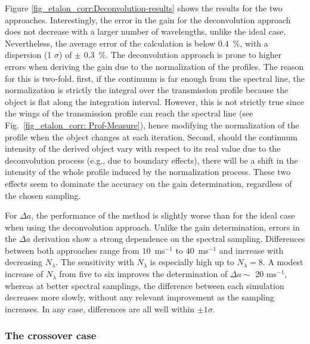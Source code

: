 Figure \ref{fig_etalon_corr:Deconvolution-results} shows the results for the two approaches. Interestingly, the error in the gain for the deconvolution approach does not decrease with a larger number of wavelengths, unlike the ideal case. Nevertheless, the average error of the calculation is below 0.4~\%, with a dispersion (1 $\sigma$) of $\pm$ 0.3~\%. The deconvolution approach is prone to higher errors when deriving the gain due to the normalization of the profiles. The reason for this is two-fold. first, if the continuum is far enough from the spectral line, the normalization is strictly the integral over the transmission profile because the object is flat along the integration interval. However, this is not strictly true since the wings of the transmission profile can reach the spectral line (see Fig.~\ref{fig_etalon_corr: Prof-Measure}), hence modifying the normalization of the profile when the object changes at each iteration. Second, should the continuum intensity of the derived object vary with respect to its real value due to the deconvolution process (e.g., due to boundary effects), there will be a shift in the intensity of the whole profile induced by the normalization process. These two effects seem to dominate the accuracy on the gain determination, regardless of the chosen sampling.

For $\Delta a$, the performance of the method is slightly worse than for the ideal case when using the deconvolution approach. Unlike the gain determination, errors in the $\Delta a$ derivation show a strong dependence on the spectral sampling. Differences between both approaches range from $10$~ms$^{-1}$ to $40$~ms$^{-1}$ and increase with decreasing $N_\lambda$. The sensitivity with $N_\lambda$ is especially high up to $N_\lambda = 8$. A modest increase of $N_\lambda$ from five to six improves the determination of $\Delta a \sim$ 20 ms$^{-1}$, whereas at better spectral samplings, the difference between each simulation decreases more slowly, without any relevant improvement as the sampling increases. In any case, differences are all well within $\pm 1\sigma$.

\subsubsection{The crossover case}

